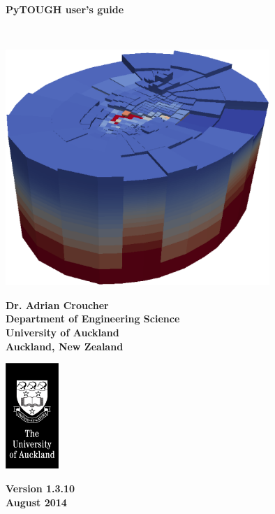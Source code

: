 \begin{titlepage}

\begin{center}

\bigskip\

\textbf{\Huge{PyTOUGH user's guide}}

\bigskip\

\includegraphics[width=0.75\textwidth]{coverpic}

\bigskip

\textbf{\large{Dr. Adrian Croucher\\
Department of Engineering Science\\
University of Auckland\\
Auckland, New Zealand}}

\bigskip
\bigskip
\bigskip

\includegraphics[height=4cm]{UoA_logo}

\bigskip
\bigskip
\bigskip
\bigskip

\textbf{\large{Version 1.3.10\\August 2014}}

\end{center}
\end{titlepage}

